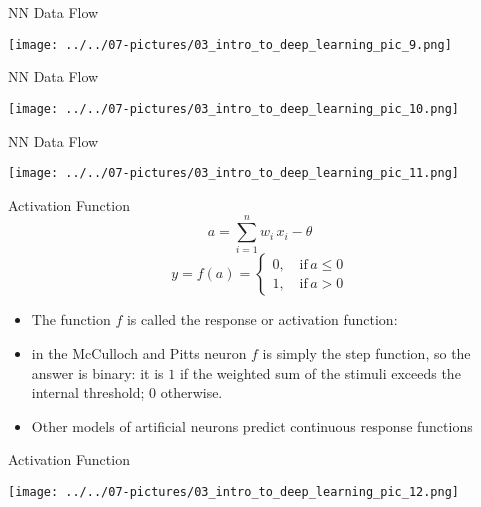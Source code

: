 \documentclass[11pt]{beamer}
\begin{document}
\begin{frame}{NN Data Flow}
	\begin{center}
	\texttt{[image: ../../07-pictures/03\_intro\_to\_deep\_learning\_pic\_9.png]}
	\end{center}
\end{frame}
\begin{frame}{NN Data Flow}
	\begin{center}
	\texttt{[image: ../../07-pictures/03\_intro\_to\_deep\_learning\_pic\_10.png]}
	\end{center}
\end{frame}
\begin{frame}{NN Data Flow}
	\begin{center}
	\texttt{[image: ../../07-pictures/03\_intro\_to\_deep\_learning\_pic\_11.png]}
	\end{center}
\end{frame}
\begin{frame}{Activation Function}
\begin{equation} a = \sum\limits_{i=1}^n w_i \, x_i - \theta \end{equation}
\begin{equation} y = f(a) = \begin{cases} 0, \quad \text{if} \, a \le 0 \\ 1, \quad \text{if} \, a > 0\end{cases} \end{equation}
	\begin{itemize}
		\item The function $f$ is called the response or activation function:
		\item in the McCulloch and Pitts neuron $f$ is simply the step function, so the answer is binary: it is $1$ if the weighted sum of the stimuli exceeds the internal threshold; $0$ otherwise.
		\item Other models of artificial neurons predict continuous response functions
	\end{itemize}
\end{frame}
\begin{frame}{Activation Function}
	\begin{center}
	\texttt{[image: ../../07-pictures/03\_intro\_to\_deep\_learning\_pic\_12.png]}
	\end{center}
\end{frame}
\end{document}
